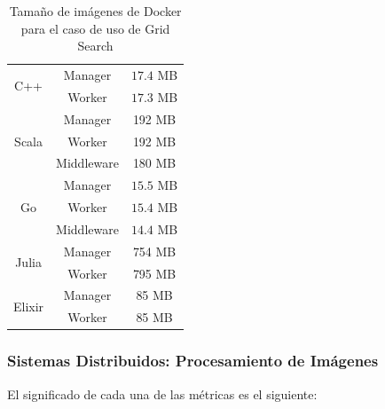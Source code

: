 \documentclass[11pt]{article}
\let\Oldsubsubsection\subsubsection
\renewcommand{\subsubsection}{\FloatBarrier\Oldsubsubsection}
\begin{document}
\begin{table}[H]
\centering
\begin{tabular}{|ccc|}
\hline
\multicolumn{1}{|c|}{\multirow{2}{*}{C++}} & \multicolumn{1}{c|}{Manager} & $17.4$ MB \\ \cline{2-3} 
\multicolumn{1}{|c|}{} & \multicolumn{1}{c|}{Worker} & $17.3$ MB \\ \hline
\multicolumn{1}{|c|}{\multirow{3}{*}{Scala}} & \multicolumn{1}{c|}{Manager} & 192 MB \\ \cline{2-3} 
\multicolumn{1}{|c|}{} & \multicolumn{1}{c|}{Worker} & 192 MB \\ \cline{2-3} 
\multicolumn{1}{|c|}{} & \multicolumn{1}{c|}{Middleware} & 180 MB \\ \hline
\multicolumn{1}{|c|}{\multirow{3}{*}{Go}} & \multicolumn{1}{c|}{Manager} & $15.5$ MB \\ \cline{2-3} 
\multicolumn{1}{|c|}{} & \multicolumn{1}{c|}{Worker} & $15.4$ MB \\ \cline{2-3} 
\multicolumn{1}{|c|}{} & \multicolumn{1}{c|}{Middleware} & $14.4$ MB \\ \hline
\multicolumn{1}{|c|}{\multirow{2}{*}{Julia}} & \multicolumn{1}{c|}{Manager} & 754 MB \\ \cline{2-3} 
\multicolumn{1}{|c|}{} & \multicolumn{1}{c|}{Worker} & 795 MB \\ \hline
\multicolumn{1}{|c|}{\multirow{2}{*}{Elixir}} & \multicolumn{1}{c|}{Manager} & 85 MB \\ \cline{2-3} 
\multicolumn{1}{|c|}{} & \multicolumn{1}{c|}{Worker} & 85 MB \\ \hline
\end{tabular}
\caption{Tamaño de imágenes de Docker para el caso de uso de Grid Search}
\end{table}

\subsubsection{Sistemas Distribuidos: Procesamiento de Imágenes} \label{sec:anex:metrics:ip}

El significado de cada una de las métricas es el siguiente:
\end{document}
